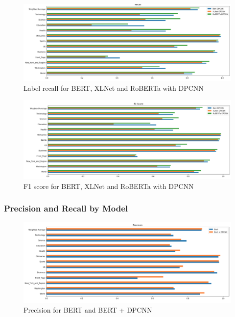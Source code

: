 \documentclass{article}
\begin{document}
\begin{figure}[!htb]
    \centering
    \includegraphics[scale=0.6]{images/recall_labels_all_models.png}
    \caption{Label recall for BERT, XLNet and RoBERTa with DPCNN}
    \label{fig:recall_labels_all_models}
\end{figure}

\begin{figure}[!htb]
    \centering
    \includegraphics[scale=0.6]{images/f1_labels_all_models.png}
    \caption{F1 score for BERT, XLNet and RoBERTa with DPCNN}
    \label{fig:f1_labels_all_models}
\end{figure}

\clearpage
\newpage
\subsubsection{Precision and Recall by Model} \label{appendix_precision_recall_model}

\begin{figure}[!htb]
    \centering
    \includegraphics[scale=0.6]{images/precision_bert.png}
    \caption{Precision for BERT and BERT + DPCNN}
    \label{fig:precision_bert}
\end{figure}
\end{document}
